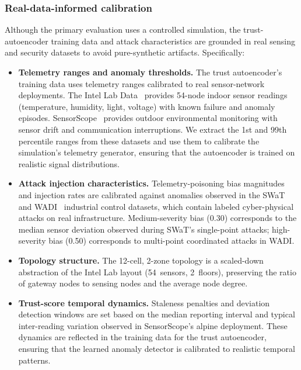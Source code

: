 \documentclass[10pt,journal,compsoc]{IEEEtran}
\begin{document}
\subsubsection{Real-data-informed calibration}
\label{sec:real_data_calibration}
Although the primary evaluation uses a controlled simulation, the trust-autoencoder training data and attack characteristics are grounded in real sensing and security datasets to avoid pure-synthetic artifacts.
Specifically:
\begin{itemize}
    \item \textbf{Telemetry ranges and anomaly thresholds.}
    The trust autoencoder's training data uses telemetry ranges calibrated to real sensor-network deployments.
    The Intel Lab Data~\cite{intel_lab_data_2004} provides 54-node indoor sensor readings (temperature, humidity, light, voltage) with known failure and anomaly episodes.
    SensorScope~\cite{sensorscope2008} provides outdoor environmental monitoring with sensor drift and communication interruptions.
    We extract the 1st and 99th percentile ranges from these datasets and use them to calibrate the simulation's telemetry generator, ensuring that the autoencoder is trained on realistic signal distributions.
    \item \textbf{Attack injection characteristics.}
    Telemetry-poisoning bias magnitudes and injection rates are calibrated against anomalies observed in the SWaT~\cite{goh2017swat} and WADI~\cite{wadi2018} industrial control datasets, which contain labeled cyber-physical attacks on real infrastructure.
    Medium-severity bias (0.30) corresponds to the median sensor deviation observed during SWaT's single-point attacks; high-severity bias (0.50) corresponds to multi-point coordinated attacks in WADI.
    \item \textbf{Topology structure.}
    The 12-cell, 2-zone topology is a scaled-down abstraction of the Intel Lab layout (54~sensors, 2~floors), preserving the ratio of gateway nodes to sensing nodes and the average node degree.
    \item \textbf{Trust-score temporal dynamics.}
    Staleness penalties and deviation detection windows are set based on the median reporting interval and typical inter-reading variation observed in SensorScope's alpine deployment.
    These dynamics are reflected in the training data for the trust autoencoder, ensuring that the learned anomaly detector is calibrated to realistic temporal patterns.
\end{itemize}
\end{document}

